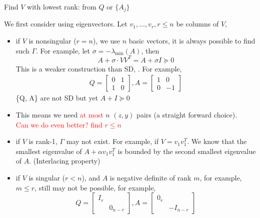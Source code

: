 \documentclass[aspectratio=1610, 9pt]{beamer}
\newcommand{\red}[1]{\textcolor{red}{#1}}
\begin{document}
\begin{frame}[allowframebreaks]{Find \(V\) with lowest rank: from \(Q\) or \(\{A_j\}\)}

  We first consider using eigenvectors. Let \(v_1, ..., v_r, r \le n\) be columns of \(V\),

  \begin{itemize}
    \item if \(V\) is nonsingular (\(r = n\)), we use \(n\) basic vectors, it is always possible to find such \(\Gamma\). For example, let \(\sigma = - \lambda_{\min} (A)\), then
          \[A + \sigma \cdot VV^T = A + \sigma I \succeq 0\]
          This is a weaker construction than SD, \cite{jiang_simultaneous_2016}. For example,
          \begin{align*}
            Q = \begin{bmatrix}0 & 1 \\ 1 & 0\end{bmatrix}, A = \begin{bmatrix}1 & 0 \\ 0 & -1\end{bmatrix}
          \end{align*}
          \{Q, A\} are not SD but yet \(A + I \succeq 0\)

    \item This means we need \red{at most} \(n\) \((z, y)\) pairs (a straight forward choice).\\
          \red{Can we do even better? find \(r \le n\)}
          \framebreak
    \item if \(V\) is rank-1, \(\Gamma\) may not exist. For example, if \(V = v_1v_1^T\). We know that the smallest eigenvalue of \(A + \alpha v_1v_1^T\) is bounded by the second smallest eigenvalue of \(A\). (Interlacing property)


    \item if \(V\) is singular (\(r < n\)), and \(A\) is negative definite of rank \(m\), for example, \(m \le r\), still may not be possible, for example,
          \[Q = \begin{bmatrix}I_r & \\ & 0_{n-r} \end{bmatrix}, A = \begin{bmatrix}0_r & \\ & - I_{n-r} \end{bmatrix}\]
  \end{itemize}

  \framebreak


\end{frame}
\end{document}
